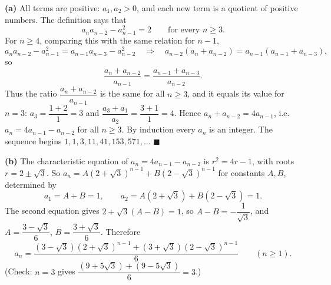 \textbf{(a)} All terms are positive: $a_1,a_2>0$, and each new term is a quotient of positive numbers. The definition says that
\[a_na_{n-2}-a_{n-1}^2=2\qquad\text{for every }n\ge3.\]
For $n\ge4$, comparing this with the same relation for $n-1$,
\[a_na_{n-2}-a_{n-1}^2=a_{n-1}a_{n-3}-a_{n-2}^2\quad\Longrightarrow\quad a_{n-2}\left(a_n+a_{n-2}\right)=a_{n-1}\left(a_{n-1}+a_{n-3}\right),\]
so
\[\dfrac{a_n+a_{n-2}}{a_{n-1}}=\dfrac{a_{n-1}+a_{n-3}}{a_{n-2}}.\]
Thus the ratio $\dfrac{a_n+a_{n-2}}{a_{n-1}}$ is the same for all $n\ge3$, and it equals its value for $n=3$: $a_3=\dfrac{1+2}{1}=3$ and $\dfrac{a_3+a_1}{a_2}=\dfrac{3+1}{1}=4$. Hence $a_n+a_{n-2}=4a_{n-1}$, i.e. $a_n=4a_{n-1}-a_{n-2}$ for all $n\ge3$. By induction every $a_n$ is an integer. The sequence begins $1,1,3,11,41,153,571,\dots$ $\blacksquare$

\textbf{(b)} The characteristic equation of $a_n=4a_{n-1}-a_{n-2}$ is $r^2=4r-1$, with roots $r=2\pm\sqrt3$. So $a_n=A\left(2+\sqrt3\right)^{n-1}+B\left(2-\sqrt3\right)^{n-1}$ for constants $A,B$, determined by
\[a_1=A+B=1,\qquad a_2=A\left(2+\sqrt3\right)+B\left(2-\sqrt3\right)=1.\]
The second equation gives $2+\sqrt3(A-B)=1$, so $A-B=-\dfrac{1}{\sqrt3}$, and $A=\dfrac{3-\sqrt3}{6}$, $B=\dfrac{3+\sqrt3}{6}$. Therefore
\[\boxed{a_n=\dfrac{\left(3-\sqrt3\right)\left(2+\sqrt3\right)^{n-1}+\left(3+\sqrt3\right)\left(2-\sqrt3\right)^{n-1}}{6}}\qquad(n\ge1).\]
(Check: $n=3$ gives $\dfrac{\left(9+5\sqrt3\right)+\left(9-5\sqrt3\right)}{6}=3$.)
